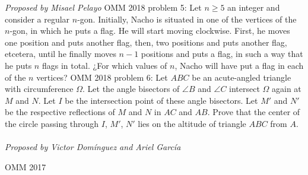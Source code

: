 \textit{Proposed by Misael Pelayo} 
OMM 2018 problem 5:  Let $n\geq 5$ an integer and consider a regular $n$-gon. Initially, Nacho is situated in one of the vertices of the $n$-gon, in which he puts a flag. He will start moving clockwise. First, he moves one position and puts another flag, then, two positions and puts another flag, etcetera, until he finally moves $n-1$ positions and puts a flag, in such a way that he puts $n$ flags in total. ¿For which values of $n$, Nacho will have put a flag in each of the $n$ vertices? 
OMM 2018 problem 6:  Let $ABC$ be an acute-angled triangle with circumference $\Omega$. Let the angle bisectors of $\angle B$ and $\angle C$ intersect $\Omega$ again at $M$ and $N$. Let $I$ be the intersection point of these angle bisectors. Let $M'$ and $N'$ be the respective reflections of $M$ and $N$ in $AC$ and $AB$. Prove that the center of the circle passing through $I$, $M'$, $N'$ lies on the altitude of triangle $ABC$ from $A$. \\\\
\textit{Proposed by Victor Domínguez and Ariel García} 

OMM 2017 

